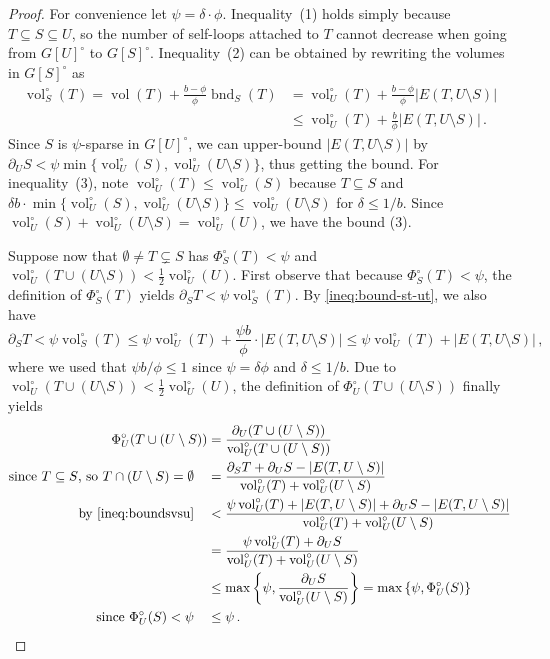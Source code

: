 \documentclass[epsfig,letter,11pt]{article}
\numberwithin{equation}{section}
\DeclareMathOperator{\vol}{vol}
\newcommand{\unbor}[2]{\operatorname{bnd}_{#2} (#1)}
\newcommand{\unvolc}[2]{\operatorname{vol}_{#2}^\circ (#1)}
\newcommand{\unspc}[2]{\Phi_{#2}^\circ (#1)}
\newcommand{\uncut}[2]{{\partial}_{#2} #1}
\begin{document}
\begin{proof}For convenience let $\psi= \delta \cdot \phi$. Inequality~(1) holds simply because $T \subseteq S \subseteq U$, so the number of self-loops attached to $T$ cannot decrease when going from $G[U]^\circ$ to $G[S]^\circ$. Inequality~(2) can be obtained by rewriting the volumes in $G[S]^\circ$ as
	\begin{align}
		\unvolc{T}{S} = \vol(T) + \frac{b-\phi}{\phi} \unbor{T}{S} & = \unvolc{T}{U} + \frac{b-\phi}{\phi} |E(T,U \setminus S)| \\
		& \leq \unvolc{T}{U} + \frac{b}{\phi} |E(T,U \setminus S)| \, .  \label{ineq:bound-st-ut}
	\end{align}
	Since $S$ is $\psi$-sparse in $G[U]^\circ$, we can upper-bound $|E(T,U \setminus S)|$ by $\uncut{S}{U} < \psi \min\{\unvolc{S}{U}, \unvolc{U \setminus S}{U}\}$, thus getting the bound. For inequality~(3), note $\unvolc{T}{U} \le \unvolc{S}{U}$ because $T \subseteq S$ and $\delta  b\cdot \min\{\unvolc{S}{U}, \unvolc{U \setminus S}{U}\} \le \unvolc{U \setminus S}{U}$ for $\delta \le 1/b$. Since $\unvolc{S}{U}+\unvolc{U \setminus S}{U}=\unvolc{U}{U}$, we have the bound (3).
	
	Suppose now that $\emptyset \neq T \subsetneq S$ has $\unspc{T}{S} < \psi$ and $\unvolc{T \cup (U \setminus S)}{U} < \frac{1}{2} \unvolc{U}{U}$. First observe that because $\unspc{T}{S} < \psi$, the definition of $\unspc{T}{S} $ yields $\uncut{T}{S} < \psi \unvolc{T}{S}$. By \cref{ineq:bound-st-ut}, we also have
	\begin{equation}
		\label{ineq:boundsvsu}
		\uncut{T}{S} < \psi \unvolc{T}{S} \leq \psi \unvolc{T}{U} + \frac{\psi b}{\phi} \cdot |E(T,U \setminus S)| \le \psi \unvolc{T}{U} +|E(T,U \setminus S)| \, ,
	\end{equation}
	where we used that $\psi  b / \phi  \le 1$ since $\psi = \delta\phi$ and $\delta \le 1/b$. Due to $\unvolc{T \cup (U \setminus S)}{U} < \frac{1}{2} \unvolc{U}{U}$, the definition of $\unspc{T \cup (U \setminus S)}{U}$ finally yields
	\begin{align*}
		\unspc{T \cup (U \setminus S)}{U} & = \frac{\uncut{(T \cup (U \setminus S))}{U}}{\unvolc{T \cup (U \setminus S)}{U}} \\
		\text{since $T \subseteq S$, so $T \cap (U \setminus S) = \emptyset$} \quad & = \frac{\uncut{T}{S} +\uncut{S}{U}-|E(T,U \setminus S)|}{\unvolc{T}{U}+\unvolc{U \setminus S}{U}} \\
		\text{by~\eqref{ineq:boundsvsu}} \quad& < \frac{\psi \unvolc{T}{U} + |E(T,U \setminus S)| +\uncut{S}{U}-|E(T,U \setminus S)|}{\unvolc{T}{U}+\unvolc{U \setminus S}{U}} \\
		& = \frac{\psi \unvolc{T}{U} +\uncut{S}{U}}{\unvolc{T}{U}+\unvolc{U \setminus S}{U}} \\
		& \le \max\left\{\psi, \frac{\uncut{S}{U}}{\unvolc{U \setminus S}{U}}\right\} = \max\left\{\psi, \unspc{S}{U}\right\} \\
		\text{since $\unspc{S}{U} <\psi$}\quad& \le \psi \, .
	\end{align*}
\end{proof}
\end{document}
